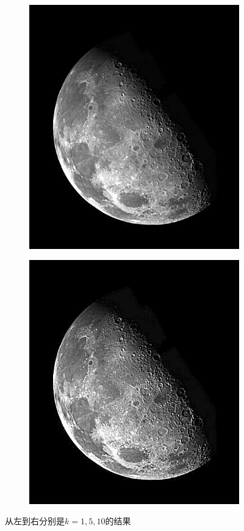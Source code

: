 \documentclass{article}
\begin{document}
\begin{figure}[htbp]
\begin{subfigure}{.3\textwidth}
        \includegraphics[width=\linewidth]{img/usm/5.png}
    \end{subfigure}
    \begin{subfigure}{.3\textwidth}
        \includegraphics[width=\linewidth]{img/usm/10.png}
    \end{subfigure}
    \caption{从左到右分别是$k=1, 5, 10$的结果}
\end{figure}
\end{document}
